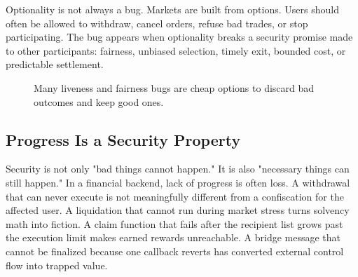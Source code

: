 Optionality is not always a bug. Markets are built from options. Users should often be allowed to withdraw, cancel orders, refuse bad trades, or stop participating. The bug appears when optionality breaks a security promise made to other participants: fairness, unbiased selection, timely exit, bounded cost, or predictable settlement.

\begin{figure}[htbp]
\centering
{}
\caption{Many liveness and fairness bugs are cheap options to discard bad outcomes and keep good ones.}
\end{figure}

\subsection{Progress Is a Security Property}

Security is not only "bad things cannot happen." It is also "necessary things can still happen." In a financial backend, lack of progress is often loss. A withdrawal that can never execute is not meaningfully different from a confiscation for the affected user. A liquidation that cannot run during market stress turns solvency math into fiction. A claim function that fails after the recipient list grows past the execution limit makes earned rewards unreachable. A bridge message that cannot be finalized because one callback reverts has converted external control flow into trapped value.

